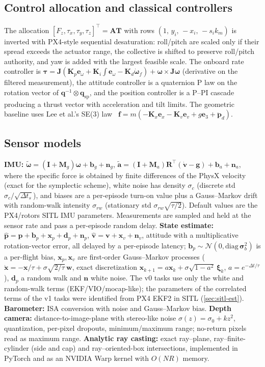 \documentclass[11pt,a4paper]{article}
\newcommand{\vect}[1]{\bm{#1}}
\begin{document}
\subsection{Control allocation and classical controllers}
The allocation $[F_z,\tau_x,\tau_y,\tau_z]^\top=\vect A\vect T$ with rows $(1,\,y_i,\,-x_i,\,-s_ik_m)$ is inverted with
PX4-style sequential desaturation: roll/pitch are scaled only if their spread exceeds the actuator range, the
collective is shifted to preserve roll/pitch authority, and yaw is added with the largest feasible scale.
The onboard rate controller is $\bm\tau=\vect J(\vect K_p\vect e_\omega+\vect K_i\!\int\!\vect e_\omega-\vect K_d\dot{\bm\omega}_f)+\bm\omega\times\vect J\bm\omega$
(derivative on the filtered measurement), the attitude controller is a quaternion P law on the rotation vector
of $\vect q^{-1}\otimes\vect q_{\mathrm{sp}}$, and the position controller is a P--PI cascade producing a thrust vector
with acceleration and tilt limits. The geometric baseline uses Lee et al.'s SE(3) law~\cite{lee2010geometric}
$\vect f=m(-\vect K_x\vect e_x-\vect K_v\vect e_v+g\vect e_3+\ddot{\vect p}_d)$.

\subsection{Sensor models}
\textbf{IMU:} $\tilde{\bm\omega}=(\vect I+\vect M_g)\bm\omega+\vect b_g+\vect n_g$,
$\tilde{\vect a}=(\vect I+\vect M_a)\vect R^\top(\dot{\vect v}-\vect g)+\vect b_a+\vect n_a$, where the specific force
is obtained by finite differences of the PhysX velocity (exact for the symplectic scheme), white noise has density
$\sigma_c$ (discrete std $\sigma_c/\sqrt{\Delta t_s}$), and biases are a per-episode turn-on value plus a Gauss--Markov drift
with random-walk intensity $\sigma_{rw}$ (stationary std $\sigma_{rw}\sqrt{\tau/2}$). Default values are the PX4/rotors
SITL IMU parameters. Measurements are sampled and held at the sensor rate and pass a per-episode random delay.
\textbf{State estimate:} $\hat{\vect p}=\vect p+\vect b_p+\vect x_p+\vect d_p+\vect n_p$,
$\hat{\vect v}=\vect v+\vect x_v+\vect n_v$, attitude with a multiplicative rotation-vector error, all delayed by a
per-episode latency; $\vect b_p\sim\mathcal N(0,\mathrm{diag}\,\bm\sigma_b^2)$ is a per-flight bias, $\vect x_p,\vect x_v$
are first-order Gauss--Markov processes ($\dot{\vect x}=-\vect x/\tau+\sigma\sqrt{2/\tau}\,\vect w$, exact
discretization $\vect x_{k+1}=a\vect x_k+\sigma\sqrt{1-a^2}\,\bm\xi_k$, $a=e^{-\Delta t/\tau}$), $\vect d_p$ a random walk and
$\vect n$ white noise. The v0 tasks use only the white and random-walk terms (EKF/VIO/mocap-like); the parameters of
the correlated terms of the v1 tasks were identified from PX4 EKF2 in SITL (\cref{sec:sitl-est}). \textbf{Barometer:} ISA conversion with noise and Gauss--Markov
bias. \textbf{Depth camera:} distance-to-image-plane with stereo-like noise $\sigma(z)=\sigma_0+kz^2$, quantization,
per-pixel dropouts, minimum/maximum range; no-return pixels read as maximum range. \textbf{Analytic ray casting:}
exact ray--plane, ray--finite-cylinder (side and cap) and ray--oriented-box intersections, implemented in PyTorch
and as an NVIDIA Warp kernel with $O(N R)$ memory.
\end{document}
